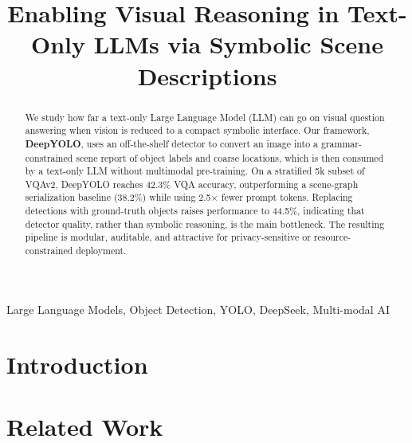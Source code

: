 \documentclass[conference]{IEEEtran}
\begin{document}
\title{Enabling Visual Reasoning in Text-Only LLMs via Symbolic Scene Descriptions}

\author{
}

\maketitle

\begin{abstract}
We study how far a text-only Large Language Model (LLM) can go on visual question answering when vision is reduced to a compact symbolic interface. Our framework, \textbf{DeepYOLO}, uses an off-the-shelf detector to convert an image into a grammar-constrained scene report of object labels and coarse locations, which is then consumed by a text-only LLM without multimodal pre-training. On a stratified 5k subset of VQAv2, DeepYOLO reaches 42.3\% VQA accuracy, outperforming a scene-graph serialization baseline (38.2\%) while using 2.5$\times$ fewer prompt tokens. Replacing detections with ground-truth objects raises performance to 44.5\%, indicating that detector quality, rather than symbolic reasoning, is the main bottleneck. The resulting pipeline is modular, auditable, and attractive for privacy-sensitive or resource-constrained deployment.
\end{abstract}

\begin{IEEEkeywords}
Large Language Models, Object Detection, YOLO, DeepSeek, Multi-modal AI
\end{IEEEkeywords}

\section{Introduction}


\section{Related Work}



\end{document}
